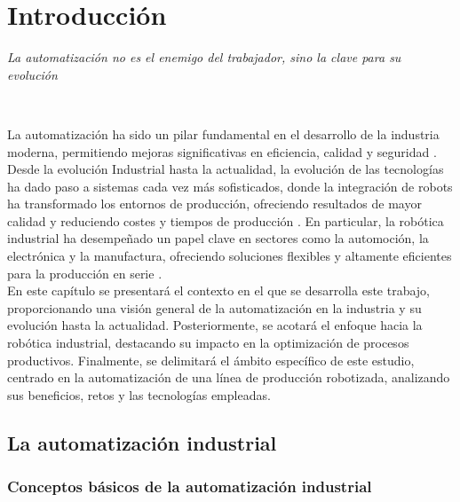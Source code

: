 \chapter{Introducción}
\label{cap:capitulo1}
\setcounter{page}{1}

\begin{flushright}
\begin{minipage}[]{10cm}
\emph{La automatización no es el enemigo del trabajador, sino la clave para su evolución}\\
\end{minipage}\\
\end{flushright}

\vspace{1cm}

La automatización ha sido un pilar fundamental en el desarrollo de la industria moderna, permitiendo mejoras significativas en eficiencia, calidad y seguridad \cite{definicion_2}. Desde la evolución Industrial hasta la actualidad, la evolución de las tecnologías ha dado paso a sistemas cada vez más sofisticados, donde la integración de robots ha transformado los entornos de producción, ofreciendo resultados de mayor calidad y reduciendo costes y tiempos de producción \cite{definicion_2}. En particular, la robótica industrial ha desempeñado un papel clave en sectores como la automoción, la electrónica y la manufactura, ofreciendo soluciones flexibles y altamente eficientes para la producción en serie \cite{definicion_2}.\\

En este capítulo se presentará el contexto en el que se desarrolla este trabajo, proporcionando una visión general de la automatización en la industria y su evolución hasta la actualidad. Posteriormente, se acotará el enfoque hacia la robótica industrial, destacando su impacto en la optimización de procesos productivos. Finalmente, se delimitará el ámbito específico de este estudio, centrado en la automatización de una línea de producción robotizada, analizando sus beneficios, retos y las tecnologías empleadas.

\section{La automatización industrial}
\label{sec:primeraseccion} %

\subsection{Conceptos básicos de la automatización industrial}

